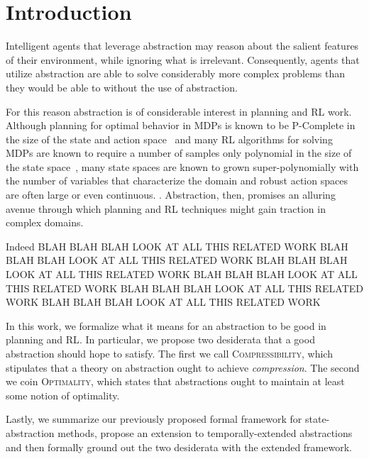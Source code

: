 \section{Introduction}
\label{sec:intro}

Intelligent agents that leverage abstraction may reason about the salient features of their environment, while ignoring what is irrelevant. Consequently, agents that utilize abstraction are able to solve considerably more complex problems than they would be able to without the use of abstraction. 

For this reason abstraction is of considerable interest in planning and \ac{RL} work.\cite{LIHONG, US ICML, OTHERS} Although planning for optimal behavior in \acp{MDP} is known to be P-Complete in the size of the state and action space~\cite{papadimitriou1987complexity,littman1995complexity} and many \ac{RL} algorithms for solving \acp{MDP} are known to require a number of samples only polynomial in the size of the state space~\cite{strehl2009reinforcement}, many state spaces are known to grown super-polynomially with the number of variables that characterize the domain \cite{abel2015goal} and robust action spaces are often large or even continuous. \cite{HARD LARGE CONTINOUS ACTION SPACE}. Abstraction, then, promises an alluring avenue through which planning and \ac{RL} techniques might gain traction in complex domains. 

Indeed BLAH BLAH BLAH LOOK AT ALL THIS RELATED WORK BLAH BLAH BLAH LOOK AT ALL THIS RELATED WORK BLAH BLAH BLAH LOOK AT ALL THIS RELATED WORK BLAH BLAH BLAH LOOK AT ALL THIS RELATED WORK BLAH BLAH BLAH LOOK AT ALL THIS RELATED WORK BLAH BLAH BLAH LOOK AT ALL THIS RELATED WORK

In this work, we formalize what it means for an abstraction to be good in planning and \ac{RL}. In particular, we propose  two desiderata that a good abstraction should hope to satisfy. The first we call \textsc{Compressibility}, which stipulates that a theory on abstraction ought to achieve {\it compression}. The second we coin \textsc{Optimality}, which states that abstractions ought to maintain at least some notion of optimality. 




Lastly, we summarize our previously proposed formal framework for state-abstraction methods, propose an extension to temporally-extended abstractions and then formally ground out the two desiderata with the extended framework. 




